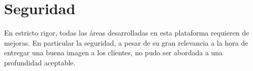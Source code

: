 








\section{Seguridad }

	En estricto rigor, todas las áreas desarrolladas en esta plataforma requieren de mejoras. En particular la seguridad, a pesar de su gran relevancia a la hora de entregar una buena imagen a los clientes, no pudo ser abordada a una profundidad aceptable.